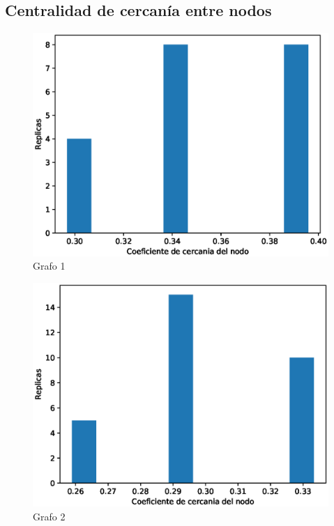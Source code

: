 \documentclass{article}
\begin{document}
\subsection{Centralidad de cercanía entre nodos}
\begin{figure}[H]
    \includegraphics[scale=0.6]{hist-agrupamiento-1}
    \caption{Grafo 1}
    \label{fig:matriz}
\end{figure}
\begin{figure}[H]
    \includegraphics[scale=0.6]{hist-agrupamiento-2}
    \caption{Grafo 2}
    \label{fig:matriz}
\end{figure}
\end{document}
